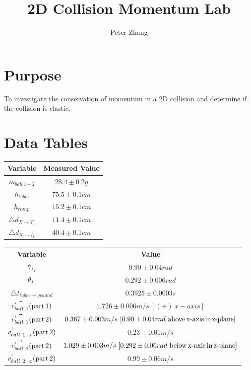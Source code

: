 \documentclass[12pt]{article}
\title{2D Collision Momentum Lab}
\author{Peter Zhang}
\begin{document}
\maketitle
\newpage


\section{Purpose}
To investigate the conservation of momentum in a 2D collision and determine if the collision is elastic.

\section{Data Tables}

\begin{center}
\begin{tabular}{|c|c|}
\hline
Variable & Measured Value\\
\hline
\hline
$m_{ball\ 1+2}$ & $28.4 \pm 0.2g$\\
\hline
$h_{table}$ & $75.5\pm0.1cm$\\
\hline
$h_{ramp}$ & $15.2\pm0.1cm$\\
\hline
$\triangle{d}_{X\rightarrow{}T_{1}}$ & $11.4\pm0.1cm$\\
\hline
$\triangle{d}_{X\rightarrow{}I_{1}}$ & $40.4\pm0.1cm$\\
\hline
\end{tabular}

\begin{tabular}{|c|c|}
\hline
Variable & Value\\
\hline
\hline
$\theta{}_{T_{1}} $ & $0.90\pm0.04rad$\\
\hline
$\theta{}_{I_{1}} $ & $0.292\pm0.006rad$\\
\hline
$\triangle{t_{table\rightarrow ground}}$ & $0.3925\pm0.0003s$\\
\hline
$\vec{v_{ball\ 1}^{'}} \ce{(part 1)}$ & $1.726\pm0.006m/s\ [(+)\ x-axis]$\\
\hline
$\vec{v_{ball\ 1}^{'}} \ce{(part 2)}$ & $0.367\pm0.003m/s\ [0.90\pm0.04rad\ \ce{above x-axis in z-plane}]$\\
\hline
$v_{ball\ 1,\ x}^{'} \ce{(part 2)}$ & $0.23\pm0.01m/s$\\
\hline
$\vec{v_{ball\ 2}^{'}} \ce{(part 2)}$ & $1.029\pm0.003m/s\ [0.292\pm0.06rad\ \ce{below x-axis in z-plane}]$\\
\hline
$v_{ball\ 2,\ x}^{'} \ce{(part 2)}$ & $0.99\pm0.06m/s$\\
\hline
\end{tabular}

\end{center}
\end{document}
